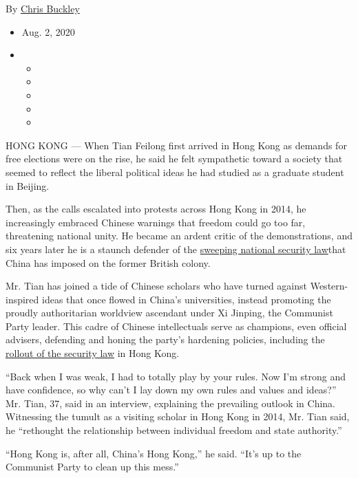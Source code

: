 By \href{https://www.nytimes3xbfgragh.onion/by/chris-buckley}{Chris
Buckley}

\begin{itemize}
\item
  Aug. 2, 2020
\item
  \begin{itemize}
  \item
  \item
  \item
  \item
  \item
  \end{itemize}
\end{itemize}

HONG KONG --- When Tian Feilong first arrived in Hong Kong as demands
for free elections were on the rise, he said he felt sympathetic toward
a society that seemed to reflect the liberal political ideas he had
studied as a graduate student in Beijing.

Then, as the calls escalated into protests across Hong Kong in 2014, he
increasingly embraced Chinese warnings that freedom could go too far,
threatening national unity. He became an ardent critic of the
demonstrations, and six years later he is a staunch defender of the
\href{https://www.nytimes3xbfgragh.onion/2020/06/30/world/asia/china-critics-security-law-hong-kong.html}{sweeping
national security law}that China has imposed on the former British
colony.

Mr. Tian has joined a tide of Chinese scholars who have turned against
Western-inspired ideas that once flowed in China's universities, instead
promoting the proudly authoritarian worldview ascendant under Xi
Jinping, the Communist Party leader. This cadre of Chinese intellectuals
serve as champions, even official advisers, defending and honing the
party's hardening policies, including the
\href{https://www.nytimes3xbfgragh.onion/2020/07/01/world/asia/hong-kong-security-law-china.html}{rollout
of the security law} in Hong Kong.

``Back when I was weak, I had to totally play by your rules. Now I'm
strong and have confidence, so why can't I lay down my own rules and
values and ideas?'' Mr. Tian, 37, said in an interview, explaining the
prevailing outlook in China. Witnessing the tumult as a visiting scholar
in Hong Kong in 2014, Mr. Tian said, he ``rethought the relationship
between individual freedom and state authority.''

``Hong Kong is, after all, China's Hong Kong,'' he said. ``It's up to
the Communist Party to clean up this mess.''

